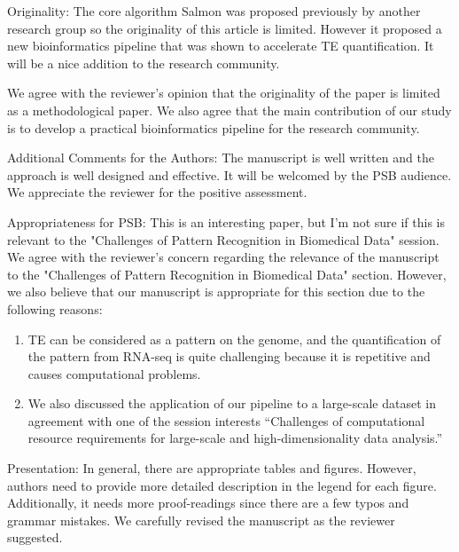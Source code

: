 \documentclass[10pt]{article}
\begin{document}
\begin{response}{Originality: The core algorithm Salmon was proposed previously by another research group so the originality of this article is limited. However it proposed a new bioinformatics pipeline that was shown to accelerate TE quantification. It will be a nice addition to the research community.}
 
We agree with the reviewer's opinion that the originality of the paper is limited as a methodological paper. We also agree that the main contribution of our study is to develop a practical bioinformatics pipeline for the research community. 
\end{response}

\begin{response}{Additional Comments for the Authors: The manuscript is well written and the approach is well designed and effective. It will be welcomed by the PSB audience.}
We appreciate the reviewer for the positive assessment. 
\end{response}

\begin{response}{Appropriateness for PSB: This is an interesting paper, but I’m not sure if this is relevant to the "Challenges of Pattern Recognition in Biomedical Data" session.}
We agree with the reviewer's concern regarding the relevance of the manuscript to the "Challenges of Pattern Recognition in Biomedical Data" section. However, we also believe that our manuscript is appropriate for this section due to the following reasons:

\begin{enumerate}
\item TE can be considered as a pattern on the genome, and the quantification of the pattern from RNA-seq is quite challenging because it is repetitive and causes computational problems.
\item We also discussed the application of our pipeline to a large-scale dataset
in agreement with one of the session interests 
``Challenges of computational resource requirements for large-scale and high-dimensionality data analysis.''
\end{enumerate}
\end{response}
\begin{response}{Presentation: In general, there are appropriate tables and figures. However, authors need to provide more detailed description in the legend for each figure. Additionally, it needs more proof-readings since there are a few typos and grammar mistakes.}
We carefully revised the manuscript as the reviewer suggested. 
\end{response}
\end{document}
